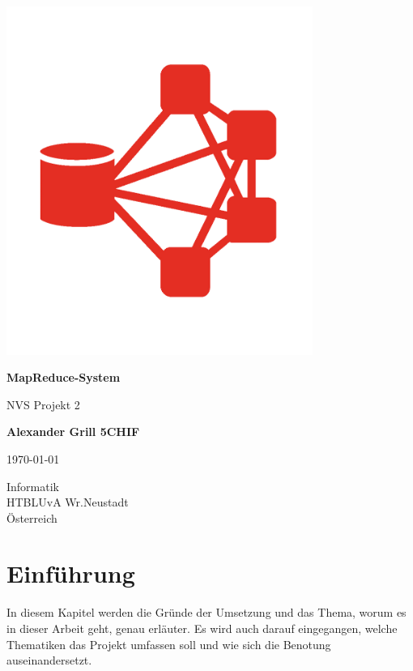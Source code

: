 \documentclass[a4paper,12pt]{article}
\begin{document}
\begin{titlepage}
    \begin{center}
        \vspace*{1cm}
        \includegraphics[width=10cm]{Logo.png}
        
        \textbf{\huge MapReduce-System}
        
        \vspace{0.5cm}
        NVS Projekt 2
                 
        \vspace{1.0cm}
    
        \textbf{Alexander Grill 5CHIF}
        
        \today
        
        \vfill
                 
                 
        \vspace{0.5cm}
                 
        Informatik\\
        HTBLUvA Wr.Neustadt\\
        Österreich\\

                 
    \end{center}
\end{titlepage}  
\newpage
\tableofcontents
\newpage


\section{Einführung}
In diesem Kapitel werden die Gründe der Umsetzung und das Thema, worum es in dieser Arbeit geht, genau erläuter. Es wird auch
darauf eingegangen, welche Thematiken das Projekt umfassen soll und wie sich die Benotung auseinandersetzt.
\end{document}
